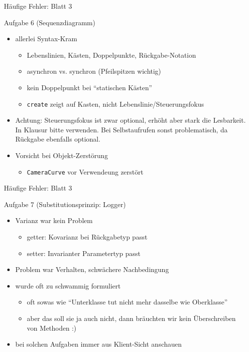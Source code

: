 \documentclass[18pt]{beamer}
\begin{document}
\begin{frame}[fragile]{Häufige Fehler: Blatt 3}
	\begin{block}{Aufgabe 6 (Sequenzdiagramm)}
		\begin{itemize}
			\item allerlei Syntax-Kram
			\begin{itemize}
				\item Lebenslinien, Kästen, Doppelpunkte, Rückgabe-Notation
				\item asynchron vs. synchron (Pfeilspitzen wichtig) 
				\item kein Doppelpunkt bei \enquote{statischen Kästen} 
				\item \texttt{create} zeigt auf Kasten, nicht Lebenslinie/Steuerungsfokus
			\end{itemize}
			\pause
			\item Achtung: Steuerungsfokus ist zwar optional, erhöht aber stark die Lesbarkeit. In Klausur bitte verwenden. Bei Selbstaufrufen sonst problematisch, da Rückgabe ebenfalls optional. \pause
			\item Vorsicht bei Objekt-Zerstörung 
			\begin{itemize}
				\item \texttt{CameraCurve} vor Verwendeung zerstört
			\end{itemize}
		\end{itemize}
	\end{block}
	
\end{frame}

\begin{frame}[fragile]{Häufige Fehler: Blatt 3}
	\begin{block}{Aufgabe 7 (Substitutionsprinzip: Logger)}
		\begin{itemize}
			\pause
			\item Varianz war kein Problem
			\begin{itemize}
				\item getter: Kovarianz bei Rückgabetyp passt
				\item setter: Invarianter Parametertyp passt
			\end{itemize} \pause
			\item Problem war Verhalten, schwächere Nachbedingung \pause
			\item wurde oft zu schwammig formuliert
			\begin{itemize}
				\item oft sowas wie \enquote{Unterklasse tut nicht mehr dasselbe wie Oberklasse}
				\item aber das soll sie ja auch nicht, dann bräuchten wir kein Überschreiben von Methoden :)
			\end{itemize}
			\item bei solchen Aufgaben immer  aus Klient-Sicht anschauen
		\end{itemize}
	\end{block}
\end{frame}
\end{document}

